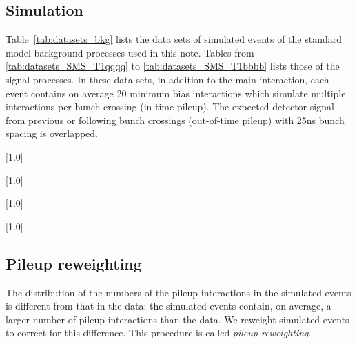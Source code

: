 \subsection{Simulation}

Table~\ref{tab:datasets_bkg} lists the data sets of simulated events
of the standard model background processes used in this note. Tables
from \ref{tab:datasets_SMS_T1qqqq} to \ref{tab:datasets_SMS_T1bbbb}
lists those of the signal processes. In these data sets, in addition
to the main interaction, each event contains on average 20 minimum
bias interactions which simulate multiple interactions per
bunch-crossing (in-time pileup). The expected detector signal from
previous or following bunch crossings (out-of-time pileup) with 25ns
bunch spacing is overlapped.

\begin{table}[!h]
 \centering
 \scriptsize
 \scalebox{.7}[1.0]{}
 \label{tab:datasets_bkg}
\end{table}

\begin{table}[!p]
 \centering
 \scriptsize
 \scalebox{.7}[1.0]{}
\label{tab:datasets_SMS_T1qqqq}
\end{table}

\begin{table}[!p]
 \centering
{}
 \scriptsize
 \scalebox{.7}[1.0]{}
\end{table}

\begin{table}[!p]
 \centering
{}
 \scriptsize
 \scalebox{.7}[1.0]{}
\label{tab:datasets_SMS_T1bbbb}
\end{table}

\clearpage

\subsection{Pileup reweighting}

The distribution of the numbers of the pileup interactions in the
simulated events is different from that in the data; the simulated
events contain, on average, a larger number of pileup interactions than
the data. We reweight simulated events to correct for this difference.
This procedure is called \textit{pileup reweighting}.

